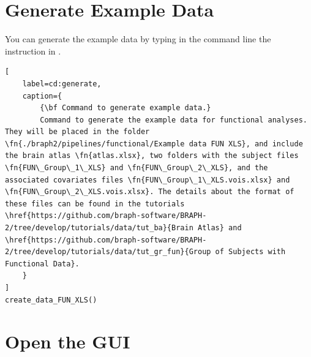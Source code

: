 \documentclass[justified]{tufte-handout}
\begin{document}
\begin{abstract}
\noindent
This tutorial shows how to perform a network analysis using \emph{functional data} (see tutorial \href{https://github.com/braph-software/BRAPH-2/tree/develop/tutorials/data/tut_gr_fun}{Group of Subjects with Functional Data}), where a functional file containing activation signals for each brain region is available for each subject, as in functional MRI, MEG, or EEG. Step by step, this pipeline guides you to compare the data from two groups of subjects at fixed densities, which correspond, for example, to fixed percentages of strongest connections to be included in the analysis (e.g., fixing the analysis at 10\% allows assessing the 10\% strongest connections in the network).  With this tutorial, you will be able to extract and plot differences between two groups. You will also be able to generate publication-quality figures.
\end{abstract}


\tableofcontents

\clearpage
\section{Generate Example Data}

You can generate the example data by typing in the command line the instruction in .

\begin{lstlisting}[
	label=cd:generate,
	caption={
		{\bf Command to generate example data.}
		Command to generate the example data for functional analyses. They will be placed in the folder \fn{./braph2/pipelines/functional/Example data FUN XLS}, and include the brain atlas \fn{atlas.xlsx}, two folders with the subject files \fn{FUN\_Group\_1\_XLS} and \fn{FUN\_Group\_2\_XLS}, and the associated covariates files \fn{FUN\_Group\_1\_XLS.vois.xlsx} and \fn{FUN\_Group\_2\_XLS.vois.xlsx}. The details about the format of these files can be found in the tutorials \href{https://github.com/braph-software/BRAPH-2/tree/develop/tutorials/data/tut_ba}{Brain Atlas} and \href{https://github.com/braph-software/BRAPH-2/tree/develop/tutorials/data/tut_gr_fun}{Group of Subjects with Functional Data}.
	}
]
create_data_FUN_XLS()
\end{lstlisting}

\section{Open the GUI}
\end{document}
